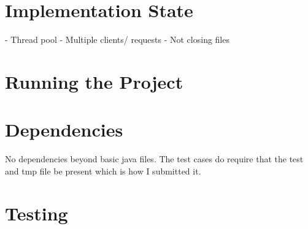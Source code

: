 \documentclass[12pt]{article}
\begin{document}

\section{Implementation State}
- Thread pool
- Multiple clients/ requests
- Not closing files


\section{Running the Project}


\section{Dependencies}

No dependencies beyond basic java files. The test cases do require that the test and tmp file be present which is how I submitted it.


\section{Testing}
\end{document}

